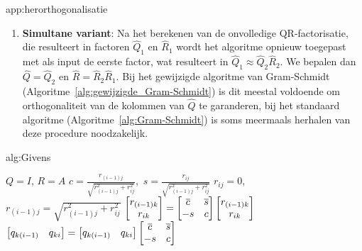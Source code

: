 \begin{app}{app:herorthogonalisatie}
\begin{enumerate}
        \item \textbf{Simultane variant}: Na het berekenen van de onvolledige QR-factorisatie, die resulteert in factoren $\hat{Q}_1$ en $\hat{R}_1$ wordt het algoritme opnieuw toegepast met als input de eerste factor, wat resulteert in $\hat{Q}_1 \approx \hat{Q}_2\hat{R}_2$. We bepalen dan $\hat{Q} = \hat{Q}_2$ en $\hat{R} = \hat{R}_2\hat{R}_1$. Bij het gewijzigde algoritme van Gram-Schmidt (Algoritme~\ref{alg:gewijzigde_Gram-Schmidt}) is dit meestal voldoende om orthogonaliteit van de kolommen van $\hat{Q}$ te garanderen, bij het standaard algoritme (Algoritme~\ref{alg:Gram-Schmidt}) is soms meermaals herhalen van deze procedure noodzakelijk.
    \end{enumerate}
\end{app}

\newpage

\begin{alg}{alg:Givens}
    \vspace{-0.3cm}
    \begin{tcolorbox}[colback=white, colframe=gray, arc=0mm] 
        \begin{algorithmic}[1]
            \State $Q = I$, $R = A$
            \State
                    \State $c = \frac{r_{(i-1)j}}{\sqrt{r_{(i-1)j}^2 + r_{ij}^2}}$,\ $s = \frac{r_{ij}}{\sqrt{r_{(i-1)j}^2 + r_{ij}^2}}$
                    \State $r_{ij} = 0$, \ $r_{(i-1)j} = \sqrt{r_{(i-1)j}^2 + r_{ij}^2}$
                       \State $\bmatrix r_{(i-1)k} \\ r_{ik} \endbmatrix = \begin{bmatrix} \overline{c} & \overline{s} \\ -s & c \end{bmatrix} \bmatrix r_{(i-1)k} \\ r_{ik} \endbmatrix$
                    \EndFor
                    \State $\bmatrix q_{k(i-1)} & q_{ki}\endbmatrix = \bmatrix q_{k(i-1)} & q_{ki} \endbmatrix \begin{bmatrix} \overline{c} & \overline{s} \\ -s & c \end{bmatrix}$
                 \EndFor
                \EndFor
            \EndFor 
        \end{algorithmic}
    \end{tcolorbox}
    \vspace{-0.3cm}
\end{alg}

